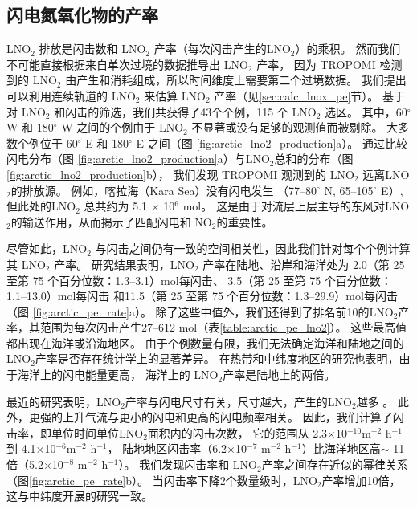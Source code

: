 \subsection{闪电氮氧化物的产率}

LNO$_2$ 排放是闪击数和 LNO$_2$ 产率（每次闪击产生的LNO$_2$）的乘积。
然而我们不可能直接根据来自单次过境的数据推导出 LNO$_2$ 产率，
因为 TROPOMI 检测到的 LNO$_2$ 由产生和消耗组成，所以时间维度上需要第二个过境数据。
我们提出可以利用连续轨道的 LNO$_2$ 来估算 LNO$_2$ 产率（见\ref{sec:calc_lnox_pe}节）。
基于对 LNO$_2$ 和闪击的筛选，我们共获得了43个个例，115 个 LNO$_2$ 选区。
其中，60$^{\circ}$ W 和 180$^{\circ}$ W 之间的个例由于 LNO$_2$ 不显著或没有足够的观测值而被剔除。
大多数个例位于 60$^{\circ}$ E 和 180$^{\circ}$ E 之间（图 \ref{fig:arctic_lno2_production}a）。
通过比较闪电分布（图 \ref{fig:arctic_lno2_production}a）与LNO$_2$总和的分布（图 \ref{fig:arctic_lno2_production}b），
我们发现 TROPOMI 观测到的 LNO$_2$ 远离LNO$_2$的排放源。
例如，喀拉海（Kara Sea）没有闪电发生 （77--80$^{\circ}$ N, 65--105$^{\circ}$ E）,
但此处的LNO$_2$ 总共约为 5.1 $\times$ 10$^6$ mol。
这是由于对流层上层主导的东风对LNO$_2$的输送作用，从而揭示了匹配闪电和 NO$_2$的重要性。

尽管如此，LNO$_2$ 与闪击之间仍有一致的空间相关性，因此我们针对每个个例计算其 LNO$_2$ 产率。
研究结果表明，LNO$_2$ 产率在陆地、沿岸和海洋处为 2.0（第 25 至第 75 个百分位数：1.3--3.1）mol每闪击、
3.5（第 25 至第 75 个百分位数：1.1--13.0）mol每闪击
和11.5（第 25 至第 75 个百分位数：1.3--29.9）mol每闪击（图 \ref{fig:arctic_pe_rate}a）。
除了这些中值外，我们还得到了排名前10的LNO$_2$产率，其范围为每次闪击产生27--612 mol（表\ref{table:arctic_pe_lno2}）。
这些最高值都出现在海洋或沿海地区。
由于个例数量有限，我们无法确定海洋和陆地之间的 LNO$_2$产率是否存在统计学上的显著差异。
在热带和中纬度地区的研究也表明，由于海洋上的闪电能量更高\citep{Beirle.2014,Hutchins.2013}，
海洋上的 LNO$_2$产率是陆地上的两倍\citep{Marais.2018,Allen.2019,Bucsela.2019}。

最近的研究表明，LNO$_2$产率与闪电尺寸有关，尺寸越大，产生的LNO$_2$越多 \citep{Huntrieser.2008,Marais.2018}。
此外，更强的上升气流与更小的闪电和更高的闪电频率相关\citep{Bruning.2013,Bruning.2015,Mecikalski.2015}。
因此，我们计算了闪击率，即单位时间单位LNO$_2$面积内的闪击次数，
它的范围从 2.3$\times$10$^{-10} $m$^{-2}$ h$^{-1}$ 到 4.1$\times$10$^{-6} $m$^{-2 }$ h$^{-1}$，
陆地地区闪击率（6.2$\times$10$^{-7}$ m$^{-2}$ h$^{-1}$）比海洋地区高$\sim$ 11 倍（5.2$\times$10$^{-8}$ m$^{-2}$ h$^{-1}$）。
我们发现闪击率和 LNO$_2$产率之间存在近似的幂律关系（图\ref{fig:arctic_pe_rate}b）。
当闪击率下降2个数量级时，LNO$_2$产率增加10倍，这与中纬度开展的研究一致\citep{Bucsela.2019,Zhang.2020b}。


